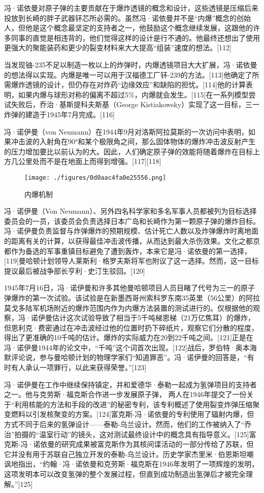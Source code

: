 冯·诺依曼对原子弹的主要贡献在于爆炸透镜的概念和设计，这些透镜是压缩后来投放到长崎的胖子武器钚芯所必需的。虽然冯·诺依曼并不是“内爆”概念的创始人，但他是这个概念最坚定的支持者之一，他鼓励这个概念继续发展，这跟他的许多同事的直觉是相违背的，他们觉得这样的设计是行不通的。他最终还想出了使用更强大的聚能装药和更少的裂变材料来大大提高“组装”速度的想法。[112]

当发现铀-235不足以制造一枚以上的炸弹时，内爆透镜项目大大扩展，冯·诺依曼的想法得以实现。内爆是唯一可以用于汉福德工厂钚-239的方法。[113]他确定了所需爆炸透镜的设计，但仍存在对炸药“边缘效应”和缺陷的担忧。[114]他的计算表明，如果内爆与球形对称的偏离不超过5\%，内爆就会发生。[115]在一系列模型尝试失败后，乔治·基斯提科夫斯基（George Kistiakowsky）实现了这一目标，三一炸弹的建造于1945年7月完成。[116]

冯·诺伊曼（von Neumann）在1944年9月对洛斯阿拉莫斯的一次访问中表明，如果冲击波的入射角在90°和某个极限角之间，那么固体物体的爆炸冲击波反射产生的压力增加要比以前认为的大。因此，人们确定原子弹的效能将随着爆炸在目标上方几公里处而不是在地面上而得到增强。[117][118]
\begin{figure}[ht]
\centering
\texttt{[image: ./figures/0d0aac4fa0e25556.png]}
\caption{内爆机制} \label{fig_von_5}
\end{figure}
冯·诺伊曼（Von Neumann）、另外四名科学家和多名军事人员都被列为目标选择委员会的一员，该委员会负责选择日本广岛和长崎作为第一颗原子弹的爆炸目标。冯·诺伊曼负责监督与炸弹爆炸的预期规模、估计死亡人数以及炸弹爆炸时离地面的距离有关的计算，以获得最佳冲击波传播，从而达到最大杀伤效果。文化之都京都作为备选的军事重镇目标避免了遭到轰炸，本来它是冯·诺依曼的第一选择，[119]曼哈顿计划领导人莱斯利·格罗夫斯将军也附议了这一选择。然而，这一目标提议最后被战争部长亨利·史汀生驳回。[120]

1945年7月16日，冯·诺伊曼和许多其他曼哈顿项目人员目睹了代号为三一的原子弹爆炸的第一次试验。该试验是在新墨西哥州索科罗东南35英里（56公里）的阿拉莫戈多陆军机场附近的爆炸范围内作为内爆方法装置的测试进行的。仅根据他的观察，冯·诺伊曼估计这次试验导致了相当于5千吨梯恩梯（21万亿焦耳）的爆炸，但恩利克·费密通过在冲击波经过他的位置时扔下碎纸片，观察它们分散的程度，得出了更准确的10千吨的估计。爆炸的实际威力在20到22千吨之间。[121]正是在冯·诺伊曼1944年的论文中，“千吨”这个词首次出现。[122]战后，罗伯特·奥本海默评论说，参与曼哈顿计划的物理学家们“知道罪恶”。冯·诺伊曼的回答是，“有时有人承认一项罪行，以此来获得荣誉。”[123]

冯·诺伊曼在工作中继续保持镇定，并和爱德华·泰勒一起成为氢弹项目的支持者之一。他与克劳斯·福克斯合作进一步发展原子弹， 两人在1946年提交了一份关于“利用核能的方法和手段的改进”的秘密专利，该专利概述了使用裂变炸弹压缩聚变燃料以引发核聚变的方案。[124]富克斯-冯·诺依曼的专利使用了辐射内爆，但方式不同于后来的氢弹设计——泰勒-乌兰设计。然而，他们的工作被纳入了“乔治”拍摄的“温室行动”的镜头，这对测试最终设计中的概念具有指导意义。[125]富克斯-冯·诺依曼的研究成果被富克斯作为其核间谍活动的一部分传给了苏联，但它并没有用于苏联自己独立开发的泰勒-乌兰设计。历史学家杰里米·伯恩斯坦嘲讽地指出，“约翰·冯·诺依曼和克劳斯·福克斯在1946年发明了一项辉煌的发明，这项发明本可以改变氢弹的整个发展过程，但直到成功制造出氢弹后才被完全理解。”[125]


